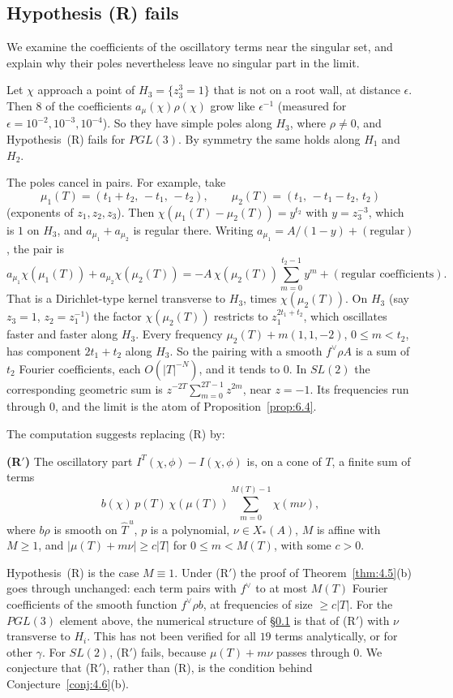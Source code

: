 \documentclass[12pt,letterpaper]{article}
\numberwithin{equation}{section}
\theoremstyle{plain}
\theoremstyle{remark}
\theoremstyle{plain}
\theoremstyle{definition}
\theoremstyle{remark}
\theoremstyle{remark}
\newcommand{\Thu}{\widehat{T}^{\,u}}
\begin{document}
\subsection{Hypothesis (R) fails}\label{sec:A.6}

We examine the coefficients of the oscillatory terms near the singular set, and explain why their poles nevertheless leave no singular part in the limit.


Let $\chi$ approach a point of $H_3=\{z_3^3=1\}$ that is not on a root wall, at distance $\epsilon$. Then $8$ of the coefficients $a_\mu(\chi)\rho(\chi)$ grow like $\epsilon^{-1}$ (measured for $\epsilon=10^{-2},10^{-3},10^{-4}$). So they have simple poles along $H_3$, where $\rho\ne0$, and Hypothesis~(R) fails for $PGL(3)$. By symmetry the same holds along $H_1$ and $H_2$.

The poles cancel in pairs. For example, take
\[
\mu_1(T)=(t_1+t_2,\,-t_1,\,-t_2),\qquad \mu_2(T)=(t_1,\,-t_1-t_2,\,t_2)
\]
(exponents of $z_1,z_2,z_3$). Then $\chi(\mu_1(T)-\mu_2(T))=y^{t_2}$ with $y=z_3^{-3}$, which is $1$ on $H_3$, and $a_{\mu_1}+a_{\mu_2}$ is regular there. Writing $a_{\mu_1}=A/(1-y)+(\text{regular})$, the pair is
\[
a_{\mu_1}\chi(\mu_1(T))+a_{\mu_2}\chi(\mu_2(T))=-A\,\chi(\mu_2(T))\sum_{m=0}^{t_2-1}y^m+(\text{regular coefficients}).
\]
That is a Dirichlet-type kernel transverse to $H_3$, times $\chi(\mu_2(T))$. On $H_3$ (say $z_3=1$, $z_2=z_1^{-1}$) the factor $\chi(\mu_2(T))$ restricts to $z_1^{2t_1+t_2}$, which oscillates faster and faster along $H_3$. Every frequency $\mu_2(T)+m(1,1,-2)$, $0\le m<t_2$, has component $2t_1+t_2$ along $H_3$. So the pairing with a smooth $f^\vee\rho A$ is a sum of $t_2$ Fourier coefficients, each $O(|T|^{-N})$, and it tends to $0$. In $SL(2)$ the corresponding geometric sum is $z^{-2T}\sum_{m=0}^{2T-1}z^{2m}$, near $z=-1$. Its frequencies run through $0$, and the limit is the atom of Proposition~\ref{prop:6.4}.

\begin{rem26}\label{r:Rprime}
The computation suggests replacing (R) by:

\smallskip
\noindent\textbf{(R$'$)} The oscillatory part $I^T(\chi,\phi)-I(\chi,\phi)$ is, on a cone of $T$, a finite sum of terms
\[
b(\chi)\,p(T)\,\chi(\mu(T))\sum_{m=0}^{M(T)-1}\chi(m\nu),
\]
where $b\rho$ is smooth on $\Thu$, $p$ is a polynomial, $\nu\in X_*(A)$, $M$ is affine with $M\ge1$, and $|\mu(T)+m\nu|\ge c|T|$ for $0\le m<M(T)$, with some $c>0$.

\smallskip
\noindent Hypothesis~(R) is the case $M\equiv1$. Under (R$'$) the proof of Theorem~\ref{thm:4.5}(b) goes through unchanged: each term pairs with $f^\vee$ to at most $M(T)$ Fourier coefficients of the smooth function $f^\vee\rho b$, at frequencies of size $\ge c|T|$. For the $PGL(3)$ element above, the numerical structure of \S\ref{sec:A.6} is that of (R$'$) with $\nu$ transverse to $H_i$. This has not been verified for all $19$ terms analytically, or for other $\gamma$. For $SL(2)$, (R$'$) fails, because $\mu(T)+m\nu$ passes through $0$. We conjecture that (R$'$), rather than (R), is the condition behind Conjecture~\ref{conj:4.6}(b).
\end{rem26}
\end{document}
